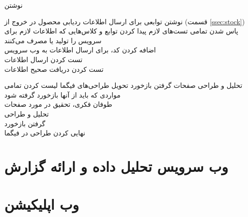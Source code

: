 \begin{wbsbox}{نوشتن }
\begin{wbssub}
{نوشتن توابعی برای ارسال اطلاعات ردیابی محصول در خروج از  (قسمت \ref{ssec:stock}\hspace{1mm})}
{پاس شدن تمامی تست‌های لازم}
پیدا کردن توابع و کلاس‌هایی که اطلاعات لازم برای سرویس را تولید یا مصرف می‌کنند \\
\task 
اضافه کردن کد، برای ارسال اطلاعات به وب ‌سرویس \\
\task
تست کردن ارسال اطلاعات \\
\task
تست کردن دریافت صحیح اطلاعات
\end{wbssub}

\begin{wbssub}
{تحلیل و طراحی صفحات گرفتن بازخورد}
{تحویل طراحی‌‌های فیگما}
\task
لیست کردن تمامی مواردی که باید از آنها بازخورد گرفته شود \\
\task
طوفان فکری،‌ تحقیق در مورد صفحات \\
\task
تحلیل و طراحی \\
\task
گرفتن بازخورد \\
\task
نهایی کردن طراحی در فیگما
\end{wbssub}
\end{wbsbox}

\section{وب سرویس تحلیل داده و ارائه گزارش}

\section{وب اپلیکیشن}